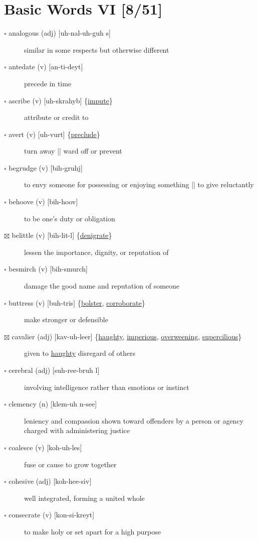 \documentclass[11pt]{article}
\begin{document}
\section{Basic Words VI [8/51]}
\label{sec:orge0e089c}
\begin{description}
\item[{$\square$ analogous (adj) [uh-nal-uh-guh s]}] similar in some respects but otherwise different
\item[{$\square$ antedate (v) [an-ti-deyt]}] precede in time
\item[{$\square$ \label{org302821a}ascribe (v) [uh-skrahyb] \{\hyperref[org41a621c]{impute}\}}] attribute or credit to
\item[{$\square$ \label{org78892f0}avert (v) [uh-vurt] \{\hyperref[org14eb2ce]{preclude}\}}] turn away || ward off or prevent
\item[{$\square$ begrudge (v) [bih-gruhj]}] to envy someone for possessing or enjoying something || to give reluctantly
\item[{$\square$ behoove (v) [bih-hoov]}] to be one's duty or obligation
\item[{$\boxtimes$ \label{org925718a} \label{orgc120ceb}belittle (v) [bih-lit-l] \{\hyperref[org1dde5c1]{denigrate}\}}] lessen the importance, dignity, or reputation of
\item[{$\square$ besmirch (v) [bih-smurch]}] damage the good name and reputation of someone
\item[{$\square$ \label{org8c441c2}buttress (v) [buh-tris] \{\hyperref[org28a9d71]{bolster}, \hyperref[orgf7ed622]{corroborate}\}}] make stronger or defensible
\item[{$\boxtimes$ \label{org3d40184}cavalier (adj) [kav-uh-leer] \{\hyperref[org7951d4f]{haughty}, \hyperref[org21b1cf6]{imperious}, \hyperref[orgd0e4f1a]{overweening}, \hyperref[org457da96]{supercilious}\}}] given to \hyperref[org7951d4f]{haughty} disregard of others
\item[{$\square$ cerebral (adj) [suh-ree-bruh l]}] involving intelligence rather than emotions or instinct
\item[{$\square$ clemency (n) [klem-uh n-see]}] leniency and compassion shown toward offenders by a person or agency charged with administering justice
\item[{$\square$ coalesce (v) [koh-uh-les]}] fuse or cause to grow together
\item[{$\square$ cohesive (adj) [koh-hee-siv]}] well integrated, forming a united whole
\item[{$\square$ consecrate (v) [kon-si-kreyt]}] to make holy or set apart for a high purpose

\end{description}
\end{document}

